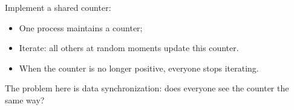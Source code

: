   \label{ex:countdown}

  Implement a shared counter:
  \begin{itemize}
  \item One process maintains a counter;
  \item Iterate: all others at random moments update this counter.
  \item When the counter is no longer positive, everyone stops iterating.
  \end{itemize}
  The problem here is data synchronization: does everyone see the
  counter the same way?
